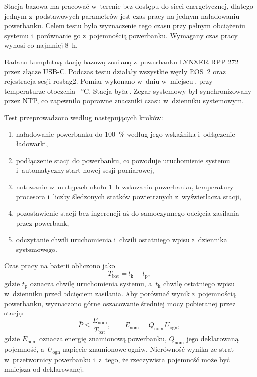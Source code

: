 Stacja bazowa ma pracować w~terenie bez dostępu do sieci energetycznej, dlatego jednym z~podstawowych parametrów jest czas pracy na jednym naładowaniu powerbanku. Celem testu było wyznaczenie tego czasu przy pełnym obciążeniu systemu i~porównanie go z~pojemnością powerbanku. Wymagany czas pracy wynosi co najmniej \SI{8}{h}.

Badano kompletną stację bazową zasilaną z~powerbanku LYNXER RPP-272 przez złącze USB-C. Podczas testu działały wszystkie węzły ROS~2 oraz rejestracja sesji rosbag2. Pomiar wykonano w~dniu  w~miejscu , przy temperaturze otoczenia ~\si{\degreeCelsius}. Stacja była . Zegar systemowy był synchronizowany przez NTP, co zapewniło poprawne znaczniki czasu w~dzienniku systemowym.

Test przeprowadzono według następujących kroków:
\begin{enumerate}
  \item naładowanie powerbanku do \SI{100}{\percent} według jego wskaźnika i~odłączenie ładowarki,
  \item podłączenie stacji do powerbanku, co powoduje uruchomienie systemu i~automatyczny start nowej sesji pomiarowej,
  \item notowanie w~odstępach około \SI{1}{h} wskazania powerbanku, temperatury procesora i~liczby śledzonych statków powietrznych z~wyświetlacza stacji,
  \item pozostawienie stacji bez ingerencji aż do samoczynnego odcięcia zasilania przez powerbank,
  \item odczytanie chwili uruchomienia i~chwili ostatniego wpisu z~dziennika systemowego.
\end{enumerate}

Czas pracy na baterii obliczono jako
\begin{equation}
  T_{\mathrm{bat}} = t_{\mathrm{k}} - t_{\mathrm{p}},
  \label{eq:t_bat}
\end{equation}
gdzie $t_{\mathrm{p}}$ oznacza chwilę uruchomienia systemu, a~$t_{\mathrm{k}}$ chwilę ostatniego wpisu w~dzienniku przed odcięciem zasilania. Aby porównać wynik z~pojemnością powerbanku, wyznaczono górne oszacowanie średniej mocy pobieranej przez stację:
\begin{equation}
  \bar{P} \leq \frac{E_{\mathrm{nom}}}{T_{\mathrm{bat}}}, \qquad E_{\mathrm{nom}} = Q_{\mathrm{nom}} \, U_{\mathrm{ogn}},
  \label{eq:p_sr}
\end{equation}
gdzie $E_{\mathrm{nom}}$ oznacza energię znamionową powerbanku, $Q_{\mathrm{nom}}$ jego deklarowaną pojemność, a~$U_{\mathrm{ogn}}$ napięcie znamionowe ogniw. Nierówność wynika ze strat w~przetwornicy powerbanku i~z~tego, że rzeczywista pojemność może być mniejsza od deklarowanej.

